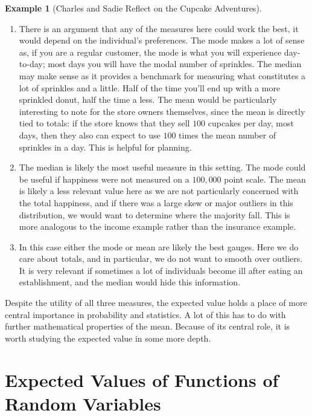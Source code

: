 \documentclass[
  letterpaper,
  DIV=11,
  numbers=noendperiod]{scrreprt}
\theoremstyle{definition}
\theoremstyle{definition}
\theoremstyle{definition}
\newtheorem{example}{Example}[chapter]
\theoremstyle{remark}
\begin{document}
\begin{example}[Charles and Sadie Reflect on the Cupcake
Adventures]
\begin{tcolorbox}[enhanced jigsaw, colback=white, breakable, rightrule=.15mm, leftrule=.75mm, toprule=.15mm, left=2mm, arc=.35mm, opacityback=0, bottomrule=.15mm]
\begin{enumerate}
\def\labelenumi{\alph{enumi}.}
\item
  There is an argument that any of the measures here could work the
  best, it would depend on the individual's preferences. The mode makes
  a lot of sense as, if you are a regular customer, the mode is what you
  will experience day-to-day; most days you will have the modal number
  of sprinkles. The median may make sense as it provides a benchmark for
  measuring what constitutes a lot of sprinkles and a little. Half of
  the time you'll end up with a more sprinkled donut, half the time a
  less. The mean would be particularly interesting to note for the store
  owners themselves, since the mean is directly tied to totals: if the
  store knows that they sell \(100\) cupcakes per day, most days, then
  they also can expect to use \(100\) times the mean number of sprinkles
  in a day. This is helpful for planning.
\item
  The median is likely the most useful measure in this setting. The mode
  could be useful if happiness were not measured on a \(100,000\) point
  scale. The mean is likely a less relevant value here as we are not
  particularly concerned with the total happiness, and if there was a
  large skew or major outliers in this distribution, we would want to
  determine where the majority fall. This is more analogous to the
  income example rather than the insurance example.
\item
  In this case either the mode or mean are likely the best gauges. Here
  we do care about totals, and in particular, we do not want to smooth
  over outliers. It is very relevant if sometimes a lot of individuals
  become ill after eating an establishment, and the median would hide
  this information.
\end{enumerate}

\end{tcolorbox}

\end{example}

Despite the utility of all three measures, the expected value holds a
place of more central importance in probability and statistics. A lot of
this has to do with further mathematical properties of the mean. Because
of its central role, it is worth studying the expected value in some
more depth.

\section{Expected Values of Functions of Random
Variables}\label{expected-values-of-functions-of-random-variables}
\end{document}
